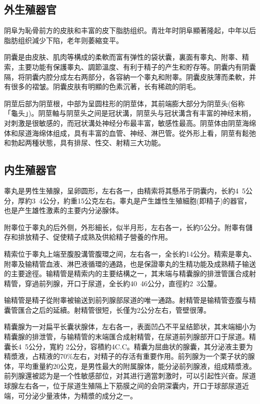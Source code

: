 \documentclass[12pt,UTF8]{ctexbook}
\begin{document}
\subsection{外生殖器官}

阴阜为恥骨前方的皮肤和丰富的皮下脂肪组织。青壯年时阴阜顯著隆起，中年以后脂肪组织減少下陷，老年则萎縮变平。

阴囊是由皮肤、肌肉等構成的柔軟而富有弹性的袋状囊，裏面有睾丸、附睾、精索，主要功能有保護睾丸、調節溫度、有利于精子的产生和貯存等。阴囊内有阴囊隔，将阴囊内腔分成左右两部分，各容納一个睾丸和附睾。阴囊皮肤薄而柔軟，并有很多的褶皱。阴囊皮肤有明顯的色素沉著，长有稀疏的阴毛。

阴莖后部为阴莖根，中部为呈圆柱形的阴莖体，其前端膨大部分为阴莖头(俗称「龜头」)。阴莖軸与阴莖头之间是冠状溝，阴莖头与冠状溝含有丰富的神经末梢，对刺激是很敏感的，而冠状溝处神经分布最丰富，敏感性最高。阴莖体由阴莖海绵体和尿道海绵体组成，具有丰富的血管、神经、淋巴管。從外形上看，阴莖有鬆弛和勃起两種状態，具有排尿、性交、射精三大功能。

\subsection{内生殖器官}

睾丸是男性生殖腺，呈卵圆形，左右各一，由精索将其懸吊于阴囊内，长約4~5公分，厚約3~4公分，約重15公克左右。睾丸是产生雄性生殖細胞(即精子)的器官，也是产生雄性激素的主要内分泌腺体。

附睾位于睾丸的后外侧，外形細长，似半月形，左右各一，长約5公分。附睾有儲存和排放精子、促使精子成熟及供給精子營養的作用。

精索位于睾丸上端至腹股溝管腹環之间，左右各一，全长約14公分。精索是睾丸、附睾及输精管血液、淋巴液循環的通路，也是保證睾丸的生精功能及成熟精子输送的主要途徑。输精管是精索内的主要结構之一，其末端与精囊腺的排泄管匯合成射精管，穿過前列腺，开口于尿道，全长約40~46公分，直徑約2~3公釐。

输精管是精子從附睾被输送到前列腺部尿道的唯一通路。射精管是输精管壺腹与精囊管匯合之后的延續。射精管很短，长僅为2公分左右，管壁很薄。

精囊腺为一对扁平长囊状腺体，左右各一，表面凹凸不平呈结節状，其末端細小为精囊腺的排泄管，与输精管的末端匯合成射精管，在尿道前列腺部开口于尿道。精囊长4~5公分，寬約 2公分，容積約4C.C。精囊为屈曲状的腺囊，其分泌液主要为精漿液，占精液的70\%左右，对精子的存活有重要作用。前列腺为一个栗子状的腺体，平均重量約20公克，是男性最大的附属腺体，能分泌前列腺液，组成精漿液。前列腺還被認为是一个性敏感部位，对其进行適當刺激时，可以引起性兴奋。尿道球腺左右各一，位于尿道生殖隔上下筋膜之间的会阴深囊内，开口于球部尿道近端，可分泌少量液体，为精漿的成分之一。
\end{document}
